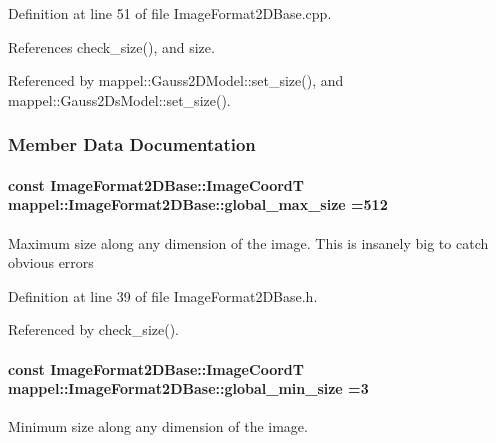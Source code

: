 Definition at line 51 of file Image\+Format2\+D\+Base.\+cpp.



References check\+\_\+size(), and size.



Referenced by mappel\+::\+Gauss2\+D\+Model\+::set\+\_\+size(), and mappel\+::\+Gauss2\+Ds\+Model\+::set\+\_\+size().



\subsubsection{Member Data Documentation}
\paragraph[{\texorpdfstring{global\+\_\+max\+\_\+size}{global_max_size}}]{\setlength{\rightskip}{0pt plus 5cm}const {\bf Image\+Format2\+D\+Base\+::\+Image\+CoordT} mappel\+::\+Image\+Format2\+D\+Base\+::global\+\_\+max\+\_\+size =512\hspace{0.3cm}{\ttfamily [static]}}\hypertarget{classmappel_1_1ImageFormat2DBase_a11c9bb87930f597dff17e9923b73bf5e}{}\label{classmappel_1_1ImageFormat2DBase_a11c9bb87930f597dff17e9923b73bf5e}
Maximum size along any dimension of the image. This is insanely big to catch obvious errors 

Definition at line 39 of file Image\+Format2\+D\+Base.\+h.



Referenced by check\+\_\+size().

\paragraph[{\texorpdfstring{global\+\_\+min\+\_\+size}{global_min_size}}]{\setlength{\rightskip}{0pt plus 5cm}const {\bf Image\+Format2\+D\+Base\+::\+Image\+CoordT} mappel\+::\+Image\+Format2\+D\+Base\+::global\+\_\+min\+\_\+size =3\hspace{0.3cm}{\ttfamily [static]}}\hypertarget{classmappel_1_1ImageFormat2DBase_a1149e8545d3cfaa40c2f3bc02e3223b2}{}\label{classmappel_1_1ImageFormat2DBase_a1149e8545d3cfaa40c2f3bc02e3223b2}
Minimum size along any dimension of the image. 

